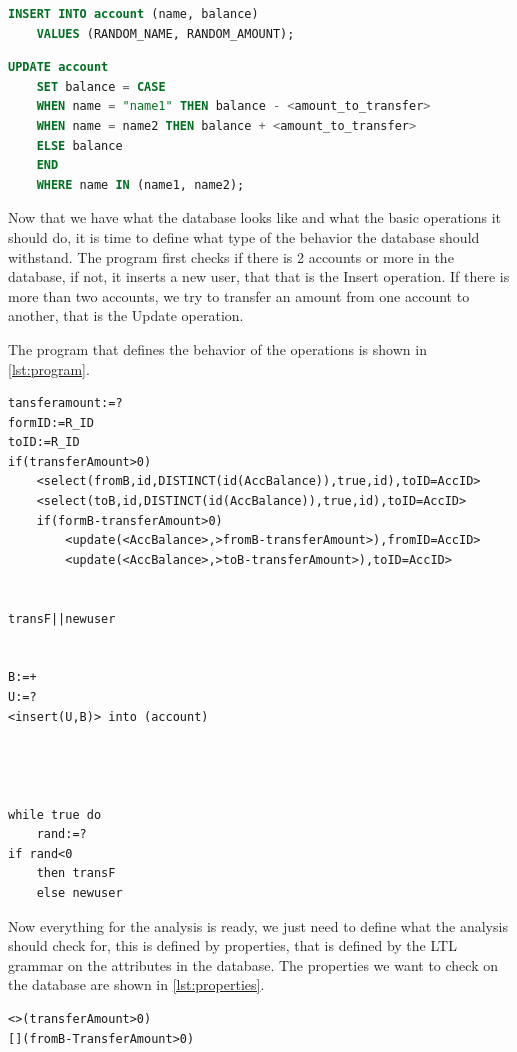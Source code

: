 \begin{lstlisting}[language=SQL,label={lst:sql-queries}]
    INSERT INTO account (name, balance)
    VALUES (RANDOM_NAME, RANDOM_AMOUNT);
\end{lstlisting}

\begin{lstlisting}[language=SQL, label={lst:sql-queries2}]
    UPDATE account
    SET balance = CASE
    WHEN name = "name1" THEN balance - <amount_to_transfer>
    WHEN name = name2 THEN balance + <amount_to_transfer>
    ELSE balance
    END
    WHERE name IN (name1, name2);
\end{lstlisting}

Now that we have what the database looks like and what the basic operations it should do, it is time to define what type of the behavior the database should withstand.
The program first checks if there is 2 accounts or more in the database, if not, it inserts a new user, that that is the Insert operation.
If there is more than two accounts, we try to transfer an amount from one account to another, that is the Update operation.

The program that defines the behavior of the operations is shown in \autoref{lst:program}.

\begin{lstlisting}[label={lst:program}]
tansferamount:=?
formID:=R_ID
toID:=R_ID
if(transferAmount>0)
    <select(fromB,id,DISTINCT(id(AccBalance)),true,id),toID=AccID>
    <select(toB,id,DISTINCT(id(AccBalance)),true,id),toID=AccID>
    if(formB-transferAmount>0)
        <update(<AccBalance>,>fromB-transferAmount>),fromID=AccID>
        <update(<AccBalance>,>toB-transferAmount>),toID=AccID>


transF||newuser


B:=+
U:=?
<insert(U,B)> into (account)




while true do
    rand:=?
if rand<0
    then transF
    else newuser
\end{lstlisting}

Now everything for the analysis is ready, we just need to define what the analysis should check for, this is defined by properties, that is defined by the LTL grammar on the attributes in the database.
The properties we want to check on the database are shown in \autoref{lst:properties}.

\begin{lstlisting}[label={lst:properties}]
<>(transferAmount>0)
[](fromB-TransferAmount>0)
    \end{lstlisting}

